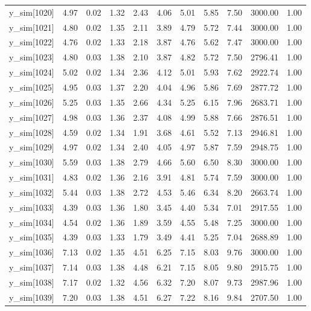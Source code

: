 \begin{table}[ht]
\begin{tabular}{rrrrrrrrrrr}
  y\_sim[1020] & 4.97 & 0.02 & 1.32 & 2.43 & 4.06 & 5.01 & 5.85 & 7.50 & 3000.00 & 1.00 \\ 
  y\_sim[1021] & 4.80 & 0.02 & 1.35 & 2.11 & 3.89 & 4.79 & 5.72 & 7.44 & 3000.00 & 1.00 \\ 
  y\_sim[1022] & 4.76 & 0.02 & 1.33 & 2.18 & 3.87 & 4.76 & 5.62 & 7.47 & 3000.00 & 1.00 \\ 
  y\_sim[1023] & 4.80 & 0.03 & 1.38 & 2.10 & 3.87 & 4.82 & 5.72 & 7.50 & 2796.41 & 1.00 \\ 
  y\_sim[1024] & 5.02 & 0.02 & 1.34 & 2.36 & 4.12 & 5.01 & 5.93 & 7.62 & 2922.74 & 1.00 \\ 
  y\_sim[1025] & 4.95 & 0.03 & 1.37 & 2.20 & 4.04 & 4.96 & 5.86 & 7.69 & 2877.72 & 1.00 \\ 
  y\_sim[1026] & 5.25 & 0.03 & 1.35 & 2.66 & 4.34 & 5.25 & 6.15 & 7.96 & 2683.71 & 1.00 \\ 
  y\_sim[1027] & 4.98 & 0.03 & 1.36 & 2.37 & 4.08 & 4.99 & 5.88 & 7.66 & 2876.51 & 1.00 \\ 
  y\_sim[1028] & 4.59 & 0.02 & 1.34 & 1.91 & 3.68 & 4.61 & 5.52 & 7.13 & 2946.81 & 1.00 \\ 
  y\_sim[1029] & 4.97 & 0.02 & 1.34 & 2.40 & 4.05 & 4.97 & 5.87 & 7.59 & 2948.75 & 1.00 \\ 
  y\_sim[1030] & 5.59 & 0.03 & 1.38 & 2.79 & 4.66 & 5.60 & 6.50 & 8.30 & 3000.00 & 1.00 \\ 
  y\_sim[1031] & 4.83 & 0.02 & 1.36 & 2.16 & 3.91 & 4.81 & 5.74 & 7.59 & 3000.00 & 1.00 \\ 
  y\_sim[1032] & 5.44 & 0.03 & 1.38 & 2.72 & 4.53 & 5.46 & 6.34 & 8.20 & 2663.74 & 1.00 \\ 
  y\_sim[1033] & 4.39 & 0.03 & 1.36 & 1.80 & 3.45 & 4.40 & 5.34 & 7.01 & 2917.55 & 1.00 \\ 
  y\_sim[1034] & 4.54 & 0.02 & 1.36 & 1.89 & 3.59 & 4.55 & 5.48 & 7.25 & 3000.00 & 1.00 \\ 
  y\_sim[1035] & 4.39 & 0.03 & 1.33 & 1.79 & 3.49 & 4.41 & 5.25 & 7.04 & 2688.89 & 1.00 \\ 
  y\_sim[1036] & 7.13 & 0.02 & 1.35 & 4.51 & 6.25 & 7.15 & 8.03 & 9.76 & 3000.00 & 1.00 \\ 
  y\_sim[1037] & 7.14 & 0.03 & 1.38 & 4.48 & 6.21 & 7.15 & 8.05 & 9.80 & 2915.75 & 1.00 \\ 
  y\_sim[1038] & 7.17 & 0.02 & 1.32 & 4.56 & 6.32 & 7.20 & 8.07 & 9.73 & 2987.96 & 1.00 \\ 
  y\_sim[1039] & 7.20 & 0.03 & 1.38 & 4.51 & 6.27 & 7.22 & 8.16 & 9.84 & 2707.50 & 1.00 \\ 

\end{tabular}
\end{table}
